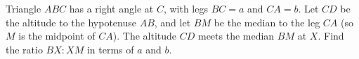 Triangle $ABC$ has a right angle at $C$, with legs $BC=a$ and $CA=b$. Let $CD$ be the altitude to the hypotenuse $AB$, and let $BM$ be the median to the leg $CA$ (so $M$ is the midpoint of $CA$). The altitude $CD$ meets the median $BM$ at $X$. Find the ratio $BX:XM$ in terms of $a$ and $b$.

